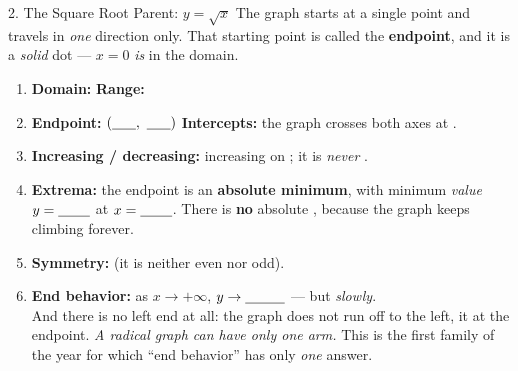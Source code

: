 \documentclass[10pt]{article}
\begin{document}
\begin{notesbox}{2. The Square Root Parent: $y=\sqrt{x}$}
\vspace{2pt}
The graph starts at a single point and travels in \emph{one} direction only. That starting point is
called the \textbf{endpoint}, and it is a \emph{solid} dot --- $x=0$ \emph{is} in the domain.
\begin{enumerate}[leftmargin=1.7em, itemsep=3pt]
  \item \textbf{Domain:} \blank{3.2cm} \quad \textbf{Range:} \blank{3.2cm}
  \item \textbf{Endpoint:} $(\blank{0.6cm},\ \blank{0.6cm})$ \quad \textbf{Intercepts:} the graph
        crosses both axes at \blank{1.6cm}.
  \item \textbf{Increasing / decreasing:} increasing on \blank{3.0cm}; it is \emph{never}
        \blank{2.4cm}.
  \item \textbf{Extrema:} the endpoint is an \textbf{absolute minimum}, with minimum \emph{value}
        $y=\blank{0.8cm}$ at $x=\blank{0.8cm}$. There is \textbf{no} absolute
        \blank{1.8cm}, because the graph keeps climbing forever.
  \item \textbf{Symmetry:} \blank{2.6cm} (it is neither even nor odd).
  \item \textbf{End behavior:} as $x\to+\infty$, $y\to\blank{1.0cm}$ --- but \emph{slowly}. \\
        And there is no left end at all: the graph does not run off to the left, it
        \blank{2.6cm} at the endpoint. \emph{A radical graph can have only one arm.} This is the
        first family of the year for which ``end behavior'' has only \emph{one} answer.
\end{enumerate}
\end{notesbox}
\end{document}
